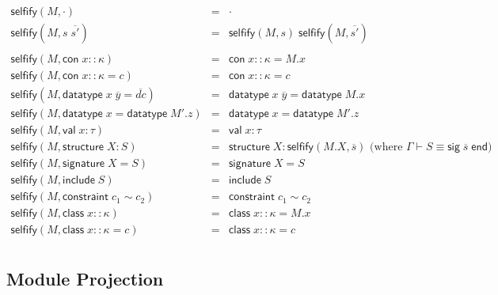 \documentclass{article}
\newcommand{\mt}[1]{\mathsf{#1}}
\begin{document}
\begin{eqnarray*}
  \mt{selfify}(M, \cdot) &=& \cdot \\
  \mt{selfify}(M, s \; \overline{s'}) &=& \mt{selfify}(M, s) \; \mt{selfify}(M, \overline{s'}) \\
  \\
  \mt{selfify}(M, \mt{con} \; x :: \kappa) &=& \mt{con} \; x :: \kappa = M.x \\
  \mt{selfify}(M, \mt{con} \; x :: \kappa = c) &=& \mt{con} \; x :: \kappa = c \\
  \mt{selfify}(M, \mt{datatype} \; x \; \overline{y} = \overline{dc}) &=& \mt{datatype} \; x \; \overline{y} = \mt{datatype} \; M.x \\
  \mt{selfify}(M, \mt{datatype} \; x = \mt{datatype} \; M'.z) &=& \mt{datatype} \; x = \mt{datatype} \; M'.z \\
  \mt{selfify}(M, \mt{val} \; x : \tau) &=& \mt{val} \; x : \tau \\
  \mt{selfify}(M, \mt{structure} \; X : S) &=& \mt{structure} \; X : \mt{selfify}(M.X, \overline{s}) \textrm{ (where $\Gamma \vdash S \equiv \mt{sig} \; \overline{s} \; \mt{end}$)} \\
  \mt{selfify}(M, \mt{signature} \; X = S) &=& \mt{signature} \; X = S \\
  \mt{selfify}(M, \mt{include} \; S) &=& \mt{include} \; S \\
  \mt{selfify}(M, \mt{constraint} \; c_1 \sim c_2) &=& \mt{constraint} \; c_1 \sim c_2 \\
  \mt{selfify}(M, \mt{class} \; x :: \kappa) &=& \mt{class} \; x :: \kappa = M.x \\
  \mt{selfify}(M, \mt{class} \; x :: \kappa = c) &=& \mt{class} \; x :: \kappa = c \\
\end{eqnarray*}

\subsection{Module Projection}
\end{document}
